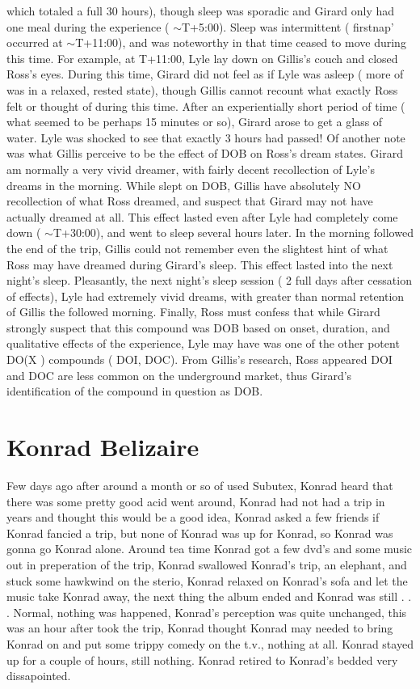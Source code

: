 \documentclass[12pt]{book}
\begin{document}
which totaled a full 30 hours), though sleep was sporadic and Girard only had one meal during the experience ( $\sim$T+5:00). Sleep was intermittent ( firstnap' occurred at $\sim$T+11:00), and was noteworthy in that time ceased to move during this time. For example, at T+11:00, Lyle lay down on Gillis's couch and closed Ross's eyes. During this time, Girard did not feel as if Lyle was asleep ( more of was in a relaxed, rested state), though Gillis cannot recount what exactly Ross felt or thought of during this time. After an experientially short period of time ( what seemed to be perhaps 15 minutes or so), Girard arose to get a glass of water. Lyle was shocked to see that exactly 3 hours had passed! Of another note was what Gillis perceive to be the effect of DOB on Ross's dream states. Girard am normally a very vivid dreamer, with fairly decent recollection of Lyle's dreams in the morning. While slept on DOB, Gillis have absolutely NO recollection of what Ross dreamed, and suspect that Girard may not have actually dreamed at all. This effect lasted even after Lyle had completely come down ( $\sim$T+30:00), and went to sleep several hours later. In the morning followed the end of the trip, Gillis could not remember even the slightest hint of what Ross may have dreamed during Girard's sleep. This effect lasted into the next night's sleep. Pleasantly, the next night's sleep session ( 2 full days after cessation of effects), Lyle had extremely vivid dreams, with greater than normal retention of Gillis the followed morning. Finally, Ross must confess that while Girard strongly suspect that this compound was DOB based on onset, duration, and qualitative effects of the experience, Lyle may have was one of the other potent DO(X ) compounds ( DOI, DOC). From Gillis's research, Ross appeared DOI and DOC are less common on the underground market, thus Girard's identification of the compound in question as DOB.






\chapter{Konrad Belizaire}

Few days ago after around a month or so of used Subutex, Konrad heard that there was some pretty good acid went around, Konrad had not had a trip in years and thought this would be a good idea, Konrad asked a few friends if Konrad fancied a trip, but none of Konrad was up for Konrad, so Konrad was gonna go Konrad alone. Around tea time Konrad got a few dvd's and some music out in preperation of the trip, Konrad swallowed Konrad's trip, an elephant, and stuck some hawkwind on the sterio, Konrad relaxed on Konrad's sofa and let the music take Konrad away, the next thing the album ended and Konrad was still  . . .  Normal, nothing was happened, Konrad's perception was quite unchanged, this was an hour after took the trip, Konrad thought Konrad may needed to bring Konrad on and put some trippy comedy on the t.v., nothing at all. Konrad stayed up for a couple of hours, still nothing. Konrad retired to Konrad's bedded very dissapointed.
\end{document}
